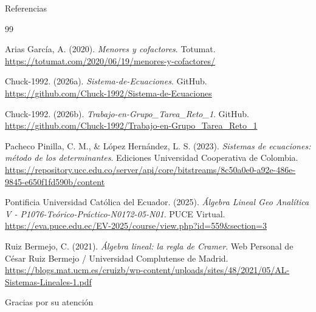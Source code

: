 \documentclass[aspectratio=169]{beamer}
\begin{document}
\begin{frame}[shrink=22]{Referencias}
\tiny
\setlength{\itemsep}{1pt}
\setlength{\parskip}{0pt}
\begin{thebibliography}{99}

Arias García, A. (2020). \textit{Menores y cofactores}. Totumat. 
\url{https://totumat.com/2020/06/19/menores-y-cofactores/}

Chuck-1992. (2026a). \textit{Sistema-de-Ecuaciones}. GitHub. 
\url{https://github.com/Chuck-1992/Sistema-de-Ecuaciones}

Chuck-1992. (2026b). \textit{Trabajo-en-Grupo\_Tarea\_Reto\_1}. GitHub. 
\url{https://github.com/Chuck-1992/Trabajo-en-Grupo_Tarea_Reto_1}

Pacheco Pinilla, C. M., \& López Hernández, L. S. (2023). 
\textit{Sistemas de ecuaciones: método de los determinantes}. 
Ediciones Universidad Cooperativa de Colombia. 
\url{https://repository.ucc.edu.co/server/api/core/bitstreams/8c50a0e0-a92e-486e-9845-e650f1fd590b/content}

Pontificia Universidad Católica del Ecuador. (2025). 
\textit{Álgebra Lineal Geo Analítica V - P1076-Teórico-Práctico-N0172-05-N01}. 
PUCE Virtual. 
\url{https://eva.puce.edu.ec/EV-2025/course/view.php?id=559&section=3}

Ruiz Bermejo, C. (2021). 
\textit{Álgebra lineal: la regla de Cramer}. 
Web Personal de César Ruiz Bermejo / Universidad Complutense de Madrid. 
\url{https://blogs.mat.ucm.es/cruizb/wp-content/uploads/sites/48/2021/05/AL-Sistemas-Lineales-1.pdf}

\end{thebibliography}
\end{frame}

\begin{frame}
\centering
\Huge Gracias por su atención
\end{frame}
\end{document}
